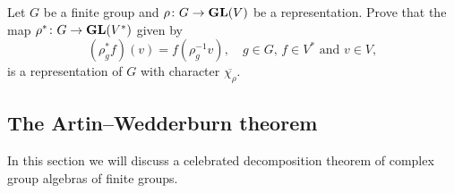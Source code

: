 \begin{bonus}
Let $G$ be a finite group and $\rho\colon G\to\mathbf{GL}(V)$ be a representation. 
Prove that the map $\rho^*\colon G\to\mathbf{GL}(V^*)$ given by 
\[
(\rho^*_gf)(v)=f(\rho^{-1}_gv),\quad
g\in G,\,f\in V^*\text{ and }v\in V,
\]  
is a representation of $G$ 
with character $\overline{\chi_\rho}$. 
\end{bonus}
%	
%
%	
%	  
%	

\subsection{The Artin--Wedderburn theorem}

In this section we will discuss a celebrated 
decomposition theorem of complex group algebras
of finite groups. 

